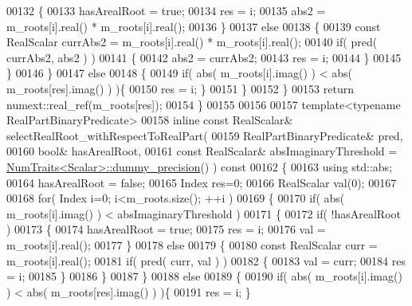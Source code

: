 \begin{DoxyCode}
00132           \{
00133             hasArealRoot = \textcolor{keyword}{true};
00134             res = i;
00135             abs2 = m\_roots[i].real() * m\_roots[i].real();
00136           \}
00137           \textcolor{keywordflow}{else}
00138           \{
00139             \textcolor{keyword}{const} RealScalar currAbs2 = m\_roots[i].real() * m\_roots[i].real();
00140             \textcolor{keywordflow}{if}( pred( currAbs2, abs2 ) )
00141             \{
00142               abs2 = currAbs2;
00143               res = i;
00144             \}
00145           \}
00146         \}
00147         \textcolor{keywordflow}{else}
00148         \{
00149           \textcolor{keywordflow}{if}( abs( m\_roots[i].imag() ) < abs( m\_roots[res].imag() ) )\{
00150             res = i; \}
00151         \}
00152       \}
00153       \textcolor{keywordflow}{return} numext::real\_ref(m\_roots[res]);
00154     \}
00155 
00156 
00157     \textcolor{keyword}{template}<\textcolor{keyword}{typename} RealPartBinaryPredicate>
00158     \textcolor{keyword}{inline} \textcolor{keyword}{const} RealScalar& selectRealRoot\_withRespectToRealPart(
00159         RealPartBinaryPredicate& pred,
00160         \textcolor{keywordtype}{bool}& hasArealRoot,
00161         \textcolor{keyword}{const} RealScalar& absImaginaryThreshold = 
      \hyperlink{group___core___module_struct_eigen_1_1_num_traits}{NumTraits<Scalar>::dummy\_precision}() )\textcolor{keyword}{ const}
00162 \textcolor{keyword}{    }\{
00163       \textcolor{keyword}{using} std::abs;
00164       hasArealRoot = \textcolor{keyword}{false};
00165       Index res=0;
00166       RealScalar val(0);
00167 
00168       \textcolor{keywordflow}{for}( Index i=0; i<m\_roots.size(); ++i )
00169       \{
00170         \textcolor{keywordflow}{if}( abs( m\_roots[i].imag() ) < absImaginaryThreshold )
00171         \{
00172           \textcolor{keywordflow}{if}( !hasArealRoot )
00173           \{
00174             hasArealRoot = \textcolor{keyword}{true};
00175             res = i;
00176             val = m\_roots[i].real();
00177           \}
00178           \textcolor{keywordflow}{else}
00179           \{
00180             \textcolor{keyword}{const} RealScalar curr = m\_roots[i].real();
00181             \textcolor{keywordflow}{if}( pred( curr, val ) )
00182             \{
00183               val = curr;
00184               res = i;
00185             \}
00186           \}
00187         \}
00188         \textcolor{keywordflow}{else}
00189         \{
00190           \textcolor{keywordflow}{if}( abs( m\_roots[i].imag() ) < abs( m\_roots[res].imag() ) )\{
00191             res = i; \}

\end{DoxyCode}
